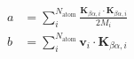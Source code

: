 \documentclass{article}
\renewcommand{\vec}[1]{\ensuremath{\mathbf{#1}}}
\begin{document}
\begin{align}
  a&=\sum\limits_i^{N_\mathrm{atom}} \frac{\vec{K}_{\beta\alpha, i}\cdot\vec{K}_{\beta\alpha, i}}{2M_i}\nonumber\\
  b&=\sum\limits_i^{N_\mathrm{atom}} \vec{v}_{i}\cdot\vec{K}_{\beta\alpha, i}
\nonumber\end{align}
\end{document}
